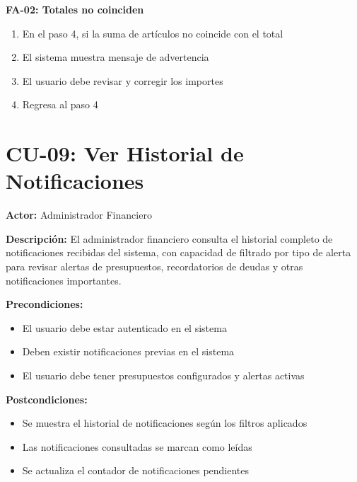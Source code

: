\textbf{FA-02: Totales no coinciden}
\begin{enumerate}
    \item En el paso 4, si la suma de artículos no coincide con el total
    \item El sistema muestra mensaje de advertencia
    \item El usuario debe revisar y corregir los importes
    \item Regresa al paso 4
\end{enumerate}

\section{CU-09: Ver Historial de Notificaciones}

\noindent\textbf{Actor:} Administrador Financiero

\noindent\textbf{Descripción:} El administrador financiero consulta el historial completo de notificaciones recibidas del sistema, con capacidad de filtrado por tipo de alerta para revisar alertas de presupuestos, recordatorios de deudas y otras notificaciones importantes.

\noindent\textbf{Precondiciones:}
\begin{itemize}
    \item El usuario debe estar autenticado en el sistema
    \item Deben existir notificaciones previas en el sistema
    \item El usuario debe tener presupuestos configurados y alertas activas
\end{itemize}

\noindent\textbf{Postcondiciones:}
\begin{itemize}
    \item Se muestra el historial de notificaciones según los filtros aplicados
    \item Las notificaciones consultadas se marcan como leídas
    \item Se actualiza el contador de notificaciones pendientes
\end{itemize}

